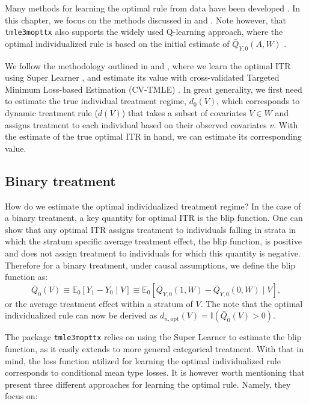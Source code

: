 \documentclass[12pt, krantz2,]{book}
\theoremstyle{definition}
\theoremstyle{definition}
\theoremstyle{definition}
\newcommand{\E}{\mathbb{E}}
\newcommand{\1}{\mathbbm{1}}
\begin{document}
Many methods for learning the optimal rule from data have been developed
\citep{murphy2003, robins2004, laber2012, kosorok2012, moodie2013}. In this
chapter, we focus on the methods discussed in \citet{luedtke2016super} and
\citet{vanderLaanLuedtke15}. Note however, that \texttt{tmle3mopttx} also supports the widely
used Q-learning approach, where the optimal individualized rule is based on the
initial estimate of \(\bar{Q}_{Y,0}(A,W)\) \citep{Sutton1998}.

We follow the methodology outlined in \citet{luedtke2016super} and
\citet{vanderLaanLuedtke15}, where we learn the optimal ITR using Super Learner
\citep{vdl2007super}, and estimate its value with cross-validated Targeted Minimum
Loss-based Estimation (CV-TMLE) \citep{cvtmle2010}. In great generality, we first
need to estimate the true individual treatment regime, \(d_0(V)\), which
corresponds to dynamic treatment rule (\(d(V)\)) that takes a subset of covariates
\(V \in W\) and assigns treatment to each individual based on their observed
covariates \(v\). With the estimate of the true optimal ITR in hand, we can
estimate its corresponding value.

\hypertarget{binary-treatment}{%
\subsection{Binary treatment}\label{binary-treatment}}

How do we estimate the optimal individualized treatment regime? In the case of a
binary treatment, a key quantity for optimal ITR is the blip function. One can
show that any optimal ITR assigns treatment to individuals falling in strata in
which the stratum specific average treatment effect, the blip function, is
positive and does not assign treatment to individuals for which this quantity is
negative. Therefore for a binary treatment, under causal assumptions, we define
the blip function as:
\[\bar{Q}_0(V) \equiv \E_0[Y_1-Y_0 \mid V] \equiv \E_0[\bar{Q}_{Y,0}(1,W) -
\bar{Q}_{Y,0}(0,W) \mid V],\]
or the average treatment effect within a stratum of \(V\). The note that the
optimal individualized rule can now be derived as \(d_{n,\text{opt}}(V) = \mathbb{I}(\bar{Q}_{0}(V) > 0)\).

The package \texttt{tmle3mopttx} relies on using the Super Learner to estimate the blip
function, as it easily extends to more general categorical treatment. With that
in mind, the loss function utilized for learning the optimal individualized rule
corresponds to conditional mean type losses. It is however worth mentioning that
\citet{luedtke2016super} present three different approaches for learning the optimal
rule. Namely, they focus on:
\end{document}
